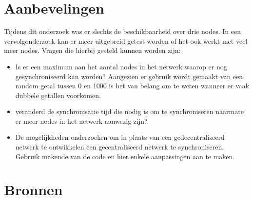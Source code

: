 \documentclass{article}
\begin{document}
\section{Aanbevelingen}
Tijdens dit onderzoek was er slechts de beschikbaarheid over drie nodes. In een vervolgonderzoek kan er meer uitgebreid getest worden of het ook werkt met veel meer nodes. Vragen die hierbij gesteld kunnen worden zijn:
\begin{itemize}
	\item Is er een maximum aan het aantal nodes in het netwerk waarop er nog gesynchroniseerd kan worden? Aangezien er gebruik wordt gemaakt van een random getal tussen 0 en 1000 is het van belang om te weten wanneer er vaak dubbele getallen voorkomen. 
	\item veranderd de synchronisatie tijd die nodig is om te synchroniseren naarmate er meer nodes in het netwerk aanwezig zijn?
	\item De mogelijkheden onderzoeken om in plaats van een gedecentraliseerd netwerk te ontwikkelen een gecentraliseerd netwerk te synchroniseren. Gebruik makende van de code en hier enkele aanpassingen aan te maken. 
\end{itemize}
\section{Bronnen}
\end{document}
